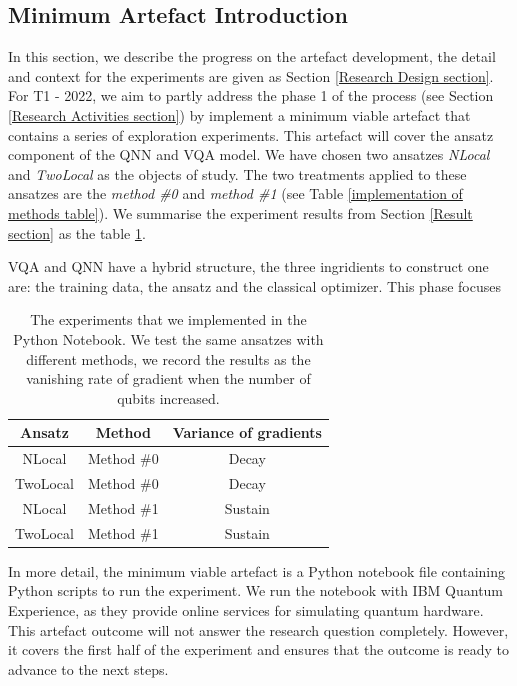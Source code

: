 \subsection{Minimum Artefact Introduction} \label{T1 artefact intro section}

In this section, we describe the progress on the artefact development, the detail and context for the experiments are given as Section \ref{Research Design section}.
For T1 - 2022, we aim to partly address the phase 1 of the process (see Section \ref{Research Activities section}) by implement a minimum viable artefact that contains a series of exploration experiments.
This artefact will cover the ansatz component of the QNN and VQA model.
We have chosen two ansatzes \emph{NLocal} and \emph{TwoLocal} as the objects of study.
The two treatments applied to these ansatzes are the \emph{method \#0} and \emph{method \#1} (see Table \ref{implementation of methods table}).
We summarise the experiment results from Section \ref{Result section} as the table \ref{Experiment summary table}.

VQA and QNN have a hybrid structure, the three ingridients to construct one are: the training data, the ansatz and the classical optimizer.
This phase focuses

\begin{table}
    \centering
    \begin{tabular}{|| c c c ||}
        \hline
        Ansatz   & Method     & Variance of gradients \\[0.5ex]
        \hline \hline
        NLocal   & Method \#0 & Decay                 \\
        \hline
        TwoLocal & Method \#0 & Decay                 \\
        \hline
        NLocal   & Method \#1 & Sustain               \\
        \hline
        TwoLocal & Method \#1 & Sustain               \\
        \hline
    \end{tabular}
    \caption{
        The experiments that we implemented in the Python Notebook. We test the same ansatzes with different methods, we record the results as the vanishing rate of gradient when the number of qubits increased.
    }
    \label{Experiment summary table}
\end{table}

In more detail, the minimum viable artefact is a Python notebook file containing Python scripts to run the experiment.
We run the notebook with IBM Quantum Experience, as they provide online services for simulating quantum hardware.
This artefact outcome will not answer the research question completely.
However, it covers the first half of the experiment and ensures that the outcome is ready to advance to the next steps.

